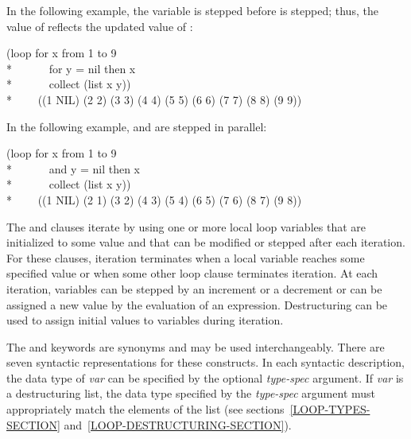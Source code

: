 In the following example, the variable  is stepped
before  is stepped; thus, the value of 
reflects the updated value of :
\begin{lisp}
(loop for x from 1 to 9 \\*
~~~~~~for y = nil then x  \\*
~~~~~~collect (list x y)) \\*
~~~\EV~((1 NIL) (2 2) (3 3) (4 4) (5 5) (6 6) (7 7) (8 8) (9 9))
\end{lisp}

In the following example,  and  are stepped in parallel:
\begin{lisp}
(loop for x from 1 to 9 \\*
~~~~~~and y = nil then x \\*
~~~~~~collect (list x y)) \\*
~~~\EV~((1 NIL) (2 1) (3 2) (4 3) (5 4) (6 5) (7 6) (8 7) (9 8))
\end{lisp}

The  and  clauses iterate by using one or more local 
loop  variables that are initialized to some value and that 
can be modified or stepped after each iteration.  
For these clauses, iteration terminates when a local
variable reaches some specified value or when some other loop clause
terminates iteration.  At each iteration, variables can be stepped by an
increment or a decrement or can be assigned a new value by 
the evaluation of 
an expression.  Destructuring can be used to assign initial values to 
variables during iteration.

The  and  keywords are synonyms and may be used
interchangeably.  There are
seven syntactic representations for these constructs.
In each syntactic description, the data type of
{\it var\/} can be specified by the optional {\it type-spec\/}
argument.  If {\it var\/} is a destructuring list, the data type
specified by the {\it type-spec\/} argument must appropriately match
the elements of the list (see sections~\ref{LOOP-TYPES-SECTION}
and~\ref{LOOP-DESTRUCTURING-SECTION}).

